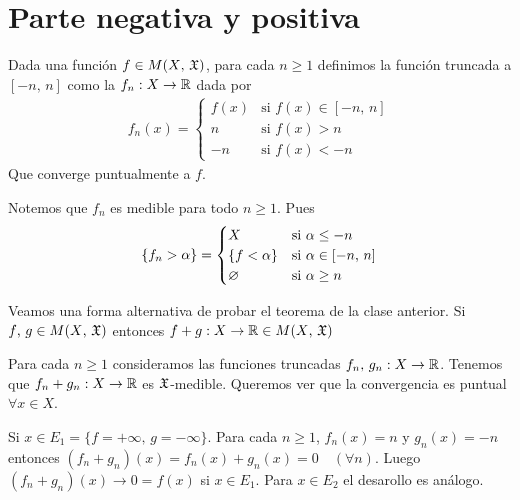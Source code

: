 \section{Parte negativa y positiva}

\begin{definition}
    Dada una función \(f \in M(X\text{, } \mathfrak{X})\), para cada \(n \geq 1\) definimos la función truncada a \([-n\text{, } n]\) como la \(f_n : X \to \mathbb{R}\) dada por
    \begin{align*}
        f_n(x) = \begin{cases}
                     f(x) & \text{si } f(x) \in [-n \text{, } n] \\
                     n    & \text{si } f(x) > n                  \\
                     -n   & \text{si } f(x) < -n
                 \end{cases}
    \end{align*}
    Que converge puntualmente a \(f\).
\end{definition}

Notemos que \(f_n\) es medible para todo \(n \geq 1\). Pues \begin{align*}
    \{ f_n > \alpha \} = \begin{cases}
                             X                & \text{si } \alpha \leq -n              \\
                             \{ f < \alpha \} & \text{si } \alpha \in [-n \text{, } n] \\
                             \varnothing               & \text{si } \alpha \geq n
                         \end{cases}
\end{align*}

Veamos una forma alternativa de probar el teorema de la clase anterior.
Si \(f\text{, } g \in M(X\text{, } \mathfrak{X})\) entonces \(f + g: X \to \mathbb{R} \in M(X\text{, } \mathfrak{X})\)

Para cada \(n \geq 1\) consideramos las funciones truncadas \(f_n\text{, } g_n : X \to \mathbb{R}\).
Tenemos que \(f_n + g_n : X \to \mathbb{R}\) es \(\mathfrak{X}\)-medible. Queremos ver que la convergencia es puntual \(\forall x \in X\).

Si \(x \in E_1 = \{ f = +\infty \text{, } g = -\infty \}\). Para cada \(n \geq 1\),
\(f_n(x) = n\) y \(g_n(x) = -n\) entonces \((f_n + g_n)(x) = f_n(x) + g_n(x) = 0 \quad (\forall n)\).
Luego \((f_n + g_n)(x) \to 0 = f(x)\) si \(x \in E_1\). Para \(x \in E_2\) el desarollo es análogo.

